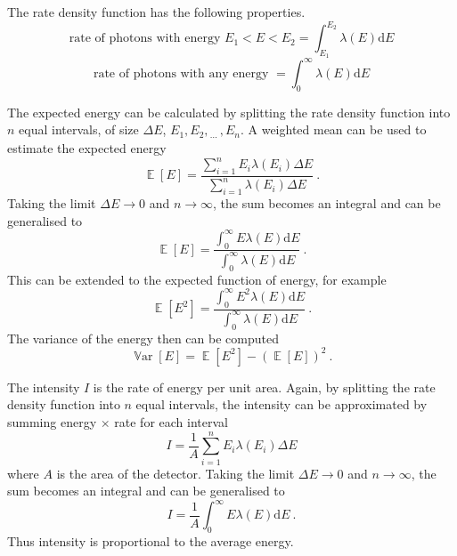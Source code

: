 \documentclass[12pt]{report}
\DeclareMathOperator{\expectation}{\mathbb{E}}
\DeclareMathOperator{\variance}{\mathbb{V}ar}
\newcommand{\diff}{\mathrm{d}}
\newcommand{\dotdotdot}{_{\phantom{.}\cdots}}
\begin{document}
The rate density function has the following properties.
\begin{equation}
\text{rate of photons with energy }E_1<E<E_2=
\int_{E_1}^{E_2}\lambda(E)\diff E
\end{equation}
\begin{equation}
\text{rate of photons with any energy }=
\int_{0}^{\infty}\lambda(E)\diff E
\end{equation}

The expected energy can be calculated by splitting the rate density function into $n$ equal intervals, of size $\Delta E$, $E_1,E_2,\dotdotdot,E_n$. A weighted mean can be used to estimate the expected energy
\begin{equation}
\expectation[E]=\frac{\sum_{i=1}^nE_i\lambda(E_i)\Delta E}{\sum_{i=1}^n\lambda(E_i)\Delta E} \ .
\end{equation}
Taking the limit $\Delta E\rightarrow0$ and $n\rightarrow\infty$, the sum becomes an integral and can be generalised to
\begin{equation}
\expectation[E]=\frac{\int_{0}^{\infty}E\lambda(E)\diff E}{\int_{0}^{\infty}\lambda(E)\diff E} \ .
\end{equation}
This can be extended to the expected function of energy, for example
\begin{equation}
\expectation[E^2]=\frac{\int_{0}^{\infty}E^2\lambda(E)\diff E}{\int_{0}^{\infty}\lambda(E)\diff E} \ .
\end{equation}
The variance of the energy then can be computed
\begin{equation}
\variance[E]=\expectation[E^2]-\left(\expectation[E]\right)^2 \ .
\end{equation}

The intensity $I$ is the rate of energy per unit area. Again, by splitting the rate density function into $n$ equal intervals, the intensity can be approximated by summing energy $\times$ rate for each interval
\begin{equation}
I = \frac{1}{A}\sum_{i=1}^nE_i\lambda(E_i)\Delta E
\end{equation}
where $A$ is the area of the detector.
Taking the limit $\Delta E\rightarrow0$ and $n\rightarrow\infty$, the sum becomes an integral and can be generalised to
\begin{equation}
I = \frac{1}{A}\int_{0}^{\infty}E\lambda(E)\diff E \ .
\end{equation}
Thus intensity is proportional to the average energy.
\end{document}
